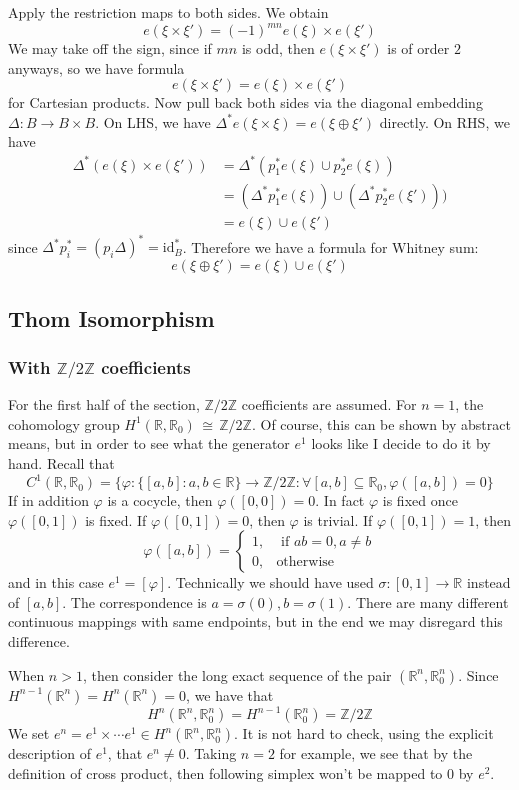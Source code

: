 \documentclass[12pt]{article}
\theoremstyle{plain}
\theoremstyle{definition}
\newcommand{\IR}{\mathbb{R}}
\newcommand{\IZ}{\mathbb{Z}}
\newcommand\iso{\,{\cong}\,}
\newcommand{\<}{\langle}
\renewcommand{\>}{\rangle}
\newcommand{\id}{\mathrm{id}}
\begin{document}
Apply the restriction maps to both sides. We obtain 
$$ e(\xi \times \xi') = (-1)^{mn} e(\xi) \times e(\xi')$$
We may take off the sign, since if $mn$ is odd, then $e(\xi \times \xi')$ is of order $2$ anyways, so we have formula
$$ e(\xi \times \xi') = e(\xi) \times e(\xi')$$
for Cartesian products. Now pull back both sides via the diagonal embedding $\Delta : B \to B \times B$. On LHS, we have $\Delta^* e(\xi \times \xi) = e (\xi \oplus \xi')$ directly. On RHS, we have 
\begin{align*}
\Delta^*(e(\xi) \times e(\xi')) & = \Delta^*( p_1^* e(\xi) \cup p_2^* e(\xi))\\
&= (\Delta^* p_1^* e(\xi) ) \cup (\Delta^* p_2^* e(\xi'))) \\
&= e(\xi) \cup e(\xi') 
\end{align*}
since $\Delta^* p_i^* = (p_i \Delta)^* = \id_B^*$. Therefore we have a formula for Whitney sum:
$$ e(\xi \oplus \xi') = e(\xi) \cup e(\xi')$$


\subsection{Thom Isomorphism}
\subsubsection{With $\IZ/2\IZ$ coefficients}
For the first half of the section, $\IZ/2\IZ$ coefficients are assumed.
For $n = 1$, the cohomology group $H^1(\IR, \IR_0) \iso \IZ/2\IZ$. Of course, this can be shown by abstract means, but in order to see what the generator $e^1$ looks like I decide to do it by hand. Recall that $$C^1(\IR, \IR_0)= \{ \varphi : \{ [a, b]: a, b \in \IR \} \to \IZ/2\IZ : \forall [a, b] \subseteq \IR_0, \varphi([a, b]) = 0 \}$$ If in addition $\varphi$ is a cocycle, then $\varphi([0, 0]) = 0$. In fact $\varphi$ is fixed once $\varphi([0, 1])$ is fixed. If $\varphi([0, 1]) = 0$, then $\varphi$ is trivial. If $\varphi([0, 1]) = 1$, then $$ \varphi([a, b]) = \begin{cases} 1, &\text{ if }ab = 0, a \neq b \\
 0,& \text{otherwise} \end{cases} $$ and in this case $e^1 = [\varphi]$. Technically we should have used $\sigma : [0,1] \to \IR$ instead of $[a, b]$. The correspondence is $a = \sigma(0), b = \sigma(1)$. There are many different continuous mappings with same endpoints, but in the end we may disregard this difference. 

When $n > 1$, then consider the long exact sequence of the pair $(\IR^n, \IR^n_0)$. Since $H^{n - 1}(\IR^n) = H^n(\IR^n) = 0$, we have that $$H^n(\IR^n, \IR^n_0) = H^{n - 1}(\IR^n_0) = \IZ / 2\IZ$$ 
We set $e^n = e^1 \times \cdots e^1 \in H^n(\IR^n, \IR^n_0)$. It is not hard to check, using the explicit description of $e^1$, that $e^n \neq 0$. Taking $n = 2$ for example, we see that by the definition of cross product, then following simplex won't be mapped to $0$ by $e^2$. 
\end{document}
